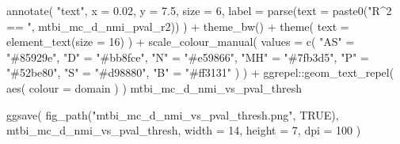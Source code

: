 \documentclass[
  letterpaper,
  DIV=11,
  numbers=noendperiod]{scrreprt}
\newenvironment{Shaded}{\begin{snugshade}}{\end{snugshade}}
\newcommand{\AttributeTok}[1]{\textcolor[rgb]{0.40,0.45,0.13}{#1}}
\newcommand{\ConstantTok}[1]{\textcolor[rgb]{0.56,0.35,0.01}{#1}}
\newcommand{\DecValTok}[1]{\textcolor[rgb]{0.68,0.00,0.00}{#1}}
\newcommand{\FloatTok}[1]{\textcolor[rgb]{0.68,0.00,0.00}{#1}}
\newcommand{\FunctionTok}[1]{\textcolor[rgb]{0.28,0.35,0.67}{#1}}
\newcommand{\NormalTok}[1]{\textcolor[rgb]{0.00,0.23,0.31}{#1}}
\newcommand{\OtherTok}[1]{\textcolor[rgb]{0.00,0.23,0.31}{#1}}
\newcommand{\SpecialCharTok}[1]{\textcolor[rgb]{0.37,0.37,0.37}{#1}}
\newcommand{\StringTok}[1]{\textcolor[rgb]{0.13,0.47,0.30}{#1}}
\begin{document}
\begin{Shaded}
\begin{Highlighting}[]
    \FunctionTok{annotate}\NormalTok{(}
        \StringTok{"text"}\NormalTok{,}
        \AttributeTok{x =} \FloatTok{0.02}\NormalTok{,}
        \AttributeTok{y =} \FloatTok{7.5}\NormalTok{,}
        \AttributeTok{size =} \DecValTok{6}\NormalTok{,}
        \AttributeTok{label =} \FunctionTok{parse}\NormalTok{(}\AttributeTok{text =} \FunctionTok{paste0}\NormalTok{(}\StringTok{"R\^{}2 == "}\NormalTok{, mtbi\_mc\_d\_nmi\_pval\_r2))}
\NormalTok{    ) }\SpecialCharTok{+}
    \FunctionTok{theme\_bw}\NormalTok{() }\SpecialCharTok{+}
    \FunctionTok{theme}\NormalTok{(}
        \AttributeTok{text =} \FunctionTok{element\_text}\NormalTok{(}\AttributeTok{size =} \DecValTok{16}\NormalTok{)}
\NormalTok{    ) }\SpecialCharTok{+}
    \FunctionTok{scale\_colour\_manual}\NormalTok{(}
        \AttributeTok{values =} \FunctionTok{c}\NormalTok{(}
            \StringTok{"AS"} \OtherTok{=} \StringTok{"\#85929e"}\NormalTok{,}
            \StringTok{"D"} \OtherTok{=} \StringTok{"\#bb8fce"}\NormalTok{,}
            \StringTok{"N"} \OtherTok{=} \StringTok{"\#e59866"}\NormalTok{,}
            \StringTok{"MH"} \OtherTok{=} \StringTok{"\#7fb3d5"}\NormalTok{,}
            \StringTok{"P"} \OtherTok{=} \StringTok{"\#52be80"}\NormalTok{,}
            \StringTok{"S"} \OtherTok{=} \StringTok{"\#d98880"}\NormalTok{,}
            \StringTok{"B"} \OtherTok{=} \StringTok{"\#ff3131"}
\NormalTok{        )}
\NormalTok{    ) }\SpecialCharTok{+}
\NormalTok{    ggrepel}\SpecialCharTok{::}\FunctionTok{geom\_text\_repel}\NormalTok{(}
        \FunctionTok{aes}\NormalTok{(}
            \AttributeTok{colour =}\NormalTok{ domain}
\NormalTok{        )}
\NormalTok{    )}
\NormalTok{mtbi\_mc\_d\_nmi\_vs\_pval\_thresh}

\FunctionTok{ggsave}\NormalTok{(}
    \FunctionTok{fig\_path}\NormalTok{(}\StringTok{"mtbi\_mc\_d\_nmi\_vs\_pval\_thresh.png"}\NormalTok{, }\ConstantTok{TRUE}\NormalTok{),}
\NormalTok{    mtbi\_mc\_d\_nmi\_vs\_pval\_thresh,}
    \AttributeTok{width =} \DecValTok{14}\NormalTok{,}
    \AttributeTok{height =} \DecValTok{7}\NormalTok{,}
    \AttributeTok{dpi =} \DecValTok{100}
\NormalTok{)}


\end{Highlighting}
\end{Shaded}
\end{document}
